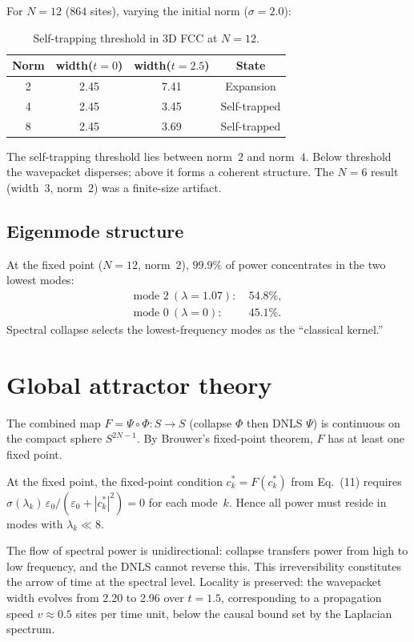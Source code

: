 \documentclass[twocolumn]{article}
\begin{document}
For $N=12$ ($864$ sites), varying the initial norm ($\sigma=2.0$):

\begin{table}[h]
  \centering
  \caption{Self-trapping threshold in 3D FCC at $N=12$.}
  \begin{tabular}{cccc}
    Norm & width($t=0$) & width($t=2.5$) & State \\
    \hline
    2 & 2.45 & 7.41 & Expansion \\
    4 & 2.45 & 3.45 & Self-trapped \\
    8 & 2.45 & 3.69 & Self-trapped \\
  \end{tabular}
\end{table}

The self-trapping threshold lies between norm~$2$ and norm~$4$.
Below threshold the wavepacket disperses; above it forms a coherent
structure. The $N=6$ result (width~$3$, norm~$2$) was a finite-size
artifact.

\subsection{Eigenmode structure}

At the fixed point ($N=12$, norm~$2$), $99.9\%$ of power concentrates
in the two lowest modes:
\begin{align}
  \text{mode }2\ (\lambda=1.07):&\ 54.8\%,\\
  \text{mode }0\ (\lambda=0):&\ 45.1\%.
\end{align}
Spectral collapse selects the lowest-frequency modes as the
``classical kernel.''

\section{Global attractor theory}

The combined map $F=\Psi\circ\Phi:S\to S$ (collapse $\Phi$ then
DNLS $\Psi$) is continuous on the compact sphere $S^{2N-1}$. By
Brouwer's fixed-point theorem, $F$ has at least one fixed point.

At the fixed point, the fixed-point condition $c_k^* = F(c_k^*)$
from Eq.~(11) requires $\sigma(\lambda_k)\,
\varepsilon_0/(\varepsilon_0+|c_k^*|^2)=0$ for each mode~$k$.
Hence all power must reside in modes with $\lambda_k\ll8$.

The flow of spectral power is unidirectional: collapse transfers
power from high to low frequency, and the DNLS cannot reverse this.
This irreversibility constitutes the arrow of time at the spectral
level. Locality is preserved: the wavepacket width evolves from 2.20
to 2.96 over $t=1.5$, corresponding to a propagation speed
$v\approx0.5$ sites per time unit, below the causal bound set by
the Laplacian spectrum.
\end{document}
